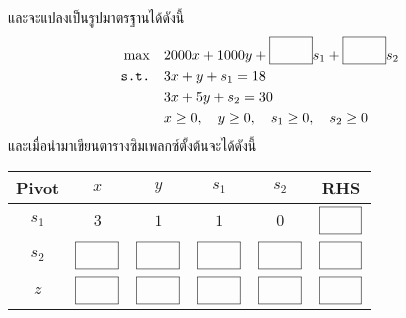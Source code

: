 \begin{multicols}{2}

    และจะแปลงเป็นรูปมาตรฐานได้ดังนี้
    \begin{align*}
        \max \quad & 2000x + 1000y + \blank[]{0.5cm}s_1+ \blank[]{0.5cm}s_2\\
        \texttt{s.t.} \quad
        & 3x + y + s_1 = 18 \\
        & 3x + 5y + s_2 = 30 \\
        & x \geq 0, \quad y \geq 0, \quad s_1 \geq 0, \quad s_2 \geq 0 
    \end{align*}
    และเมื่อนำมาเขียนตารางซิมเพลกซ์ตั้งต้นจะได้ดังนี้
    \begin{center}
        \begin{tabular}{|c|cccc|c|}
            \hline
            \textbf{Pivot} & $x$ & $y$ &  $s_1$ & $s_2$ &  \textbf{RHS} \\
            \hline
            $s_1$ & $3$ & $1$  & $1$ & $0$ & $\blank[]{0.5cm}$ \\
            $s_2$ & $\blank[]{0.5cm}$ & $\blank[]{0.5cm}$  & $\blank[]{0.5cm}$ & $\blank[]{0.5cm}$ & $\blank[]{0.5cm}$ \\
            \hline
            $z$   & $\blank[]{0.5cm}$ & $\blank[]{0.5cm}$  & $\blank[]{0.5cm}$ & $\blank[]{0.5cm}$ & $\blank[]{0.5cm}$ \\
            \hline
        \end{tabular}
    \end{center}
\end{multicols}


